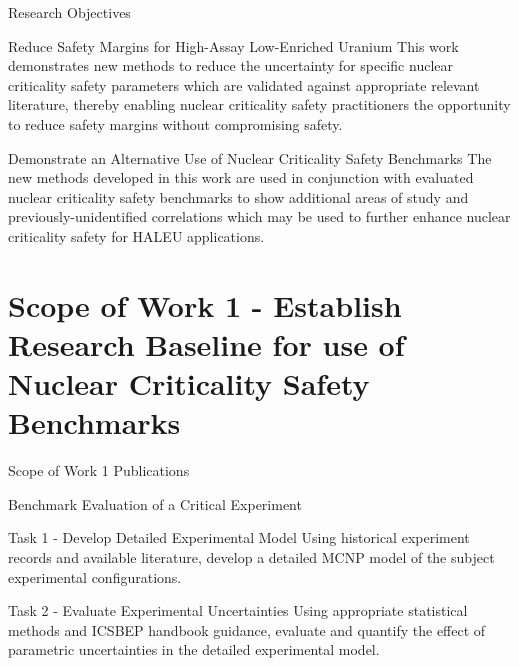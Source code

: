 \documentclass[10pt,aspectratio=169]{beamer}              %
\begin{document}
\begin{frame}{Research Objectives}
    \begin{block}{Reduce Safety Margins for High-Assay Low-Enriched Uranium}
        This work demonstrates new methods to reduce the uncertainty for specific nuclear criticality safety parameters which are validated against appropriate relevant literature, thereby enabling nuclear criticality safety practitioners the opportunity to reduce safety margins without compromising safety.
    \end{block}
    \begin{block}{Demonstrate an Alternative Use of Nuclear Criticality Safety Benchmarks}
        The new methods developed in this work are used in conjunction with evaluated nuclear criticality safety benchmarks to show additional areas of study and previously-unidentified correlations which may be used to further enhance nuclear criticality safety for HALEU applications.
    \end{block}
\end{frame}

\section[Scope of Work 1]{Scope of Work 1 - Establish Research Baseline for use of Nuclear Criticality Safety Benchmarks}

\begin{frame}{Scope of Work 1 Publications}
    \begin{block}{}
        \textbf{}
    \end{block}
\end{frame}

\begin{frame}{Benchmark Evaluation of a Critical Experiment}
    \begin{block}{Task 1 - Develop Detailed Experimental Model}
        Using historical experiment records and available literature, develop a detailed MCNP model of the subject experimental configurations.
    \end{block}
    \begin{block}{Task 2 - Evaluate Experimental Uncertainties}
        Using appropriate statistical methods and ICSBEP handbook guidance, evaluate and quantify the effect of parametric uncertainties in the detailed experimental model.
    \end{block}
\end{frame}
\end{document}
